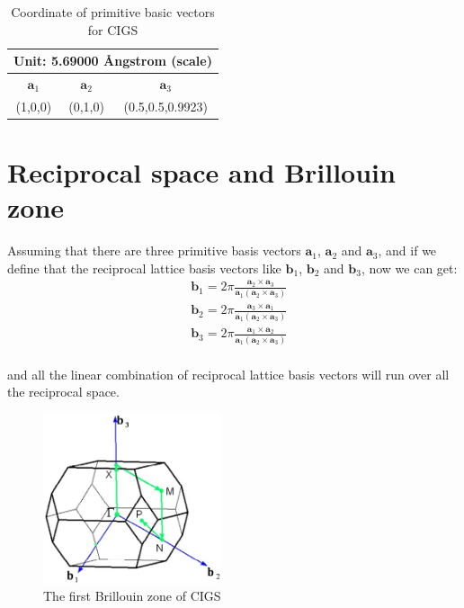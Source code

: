 \documentclass[a4paper, 12pt, titlepage,oneside,drop]{kthesis}
\begin{document}
\begin{table}
\begin{center}
\begin{tabular}{|c|c|c|}
  \hline
  \multicolumn{3}{|c|}{Unit: 5.69000 {\AA}ngstrom (scale)} \\
  \hline
  $\textbf{a}_1$ & $\textbf{a}_2$ & $\textbf{a}_3$ \\ \hline
   (1,0,0) & (0,1,0) & (0.5,0.5,0.9923)   \\ 
  \hline
\end{tabular}
\caption{Coordinate of primitive basic vectors for CIGS}
\end{center}
\end{table}

\section{Reciprocal space and Brillouin zone}
\noindent Assuming that there are three primitive basis vectors  $\textbf{a}_{1}$, $\textbf{a}_{2}$ and  $\textbf{a}_{3}$, and if we define that the reciprocal lattice basis vectors
like  $\textbf{b}_{1}$, $\textbf{b}_{2}$ and  $\textbf{b}_{3}$, now we can get:
\begin{equation}\begin{split}
& \textbf{b}_1 = 2 \pi \frac{\textbf{a}_2 \times \textbf{a}_3}{\textbf{a}_1 (\textbf{a}_2 \times \textbf{a}_3)} \\
& \textbf{b}_2 = 2 \pi \frac{\textbf{a}_3 \times \textbf{a}_1}{\textbf{a}_1 (\textbf{a}_2 \times \textbf{a}_3)} \\
& \textbf{b}_3 = 2 \pi \frac{\textbf{a}_1 \times \textbf{a}_2}{\textbf{a}_1 (\textbf{a}_2 \times \textbf{a}_3)} \\
\end{split}\end{equation}

\noindent and all the linear combination of reciprocal lattice basis vectors will run over all the reciprocal space.

\begin{figure}[h]\label{bz}
\begin{center}
\includegraphics[height=50mm]{bz.eps}
\caption{The first Brillouin zone of CIGS}
\end{center}
\end{figure}
\end{document}
